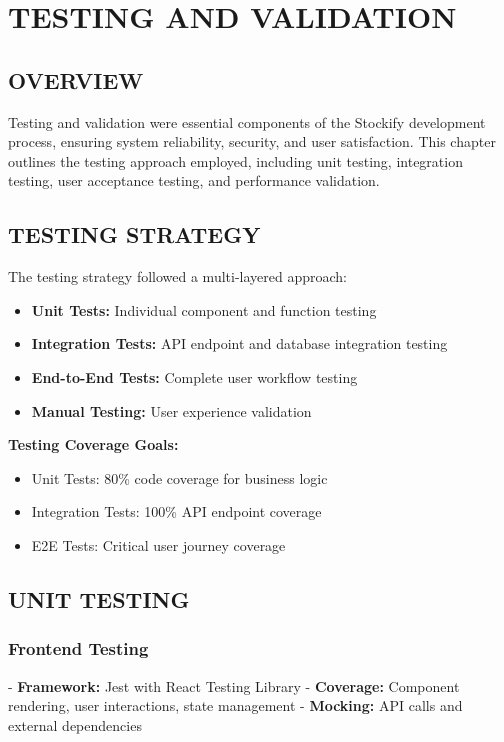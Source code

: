 \chapter{TESTING AND VALIDATION}

\section{OVERVIEW}

Testing and validation were essential components of the Stockify development process, ensuring system reliability, security, and user satisfaction. This chapter outlines the testing approach employed, including unit testing, integration testing, user acceptance testing, and performance validation.

\section{TESTING STRATEGY}

The testing strategy followed a multi-layered approach:

\begin{itemize}
\item \textbf{Unit Tests:} Individual component and function testing
\item \textbf{Integration Tests:} API endpoint and database integration testing  
\item \textbf{End-to-End Tests:} Complete user workflow testing
\item \textbf{Manual Testing:} User experience validation
\end{itemize}

\textbf{Testing Coverage Goals:}
\begin{itemize}
\item Unit Tests: 80\% code coverage for business logic
\item Integration Tests: 100\% API endpoint coverage
\item E2E Tests: Critical user journey coverage
\end{itemize}

\section{UNIT TESTING}

\subsection{Frontend Testing}
- \textbf{Framework:} Jest with React Testing Library
- \textbf{Coverage:} Component rendering, user interactions, state management
- \textbf{Mocking:} API calls and external dependencies

